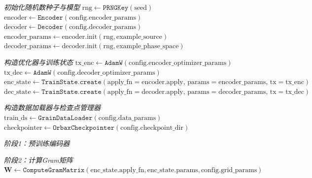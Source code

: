 \begin{algorithm}[htbp]
    \caption{EfficientRTE完整训练流程}
    \label{alg:training_efficientrte}
    \SetAlgoLined

    \BlankLine

    \emph{初始化随机数种子与模型}\;
    $\text{rng} \gets \texttt{PRNGKey}(\text{seed})$\;
    $\text{encoder} \gets \texttt{Encoder}(\text{config.encoder\_params})$\;
    $\text{decoder} \gets \texttt{Decoder}(\text{config.decoder\_params})$\;
    $\text{encoder\_params} \gets \text{encoder.init}(\text{rng}, \text{example\_source})$\;
    $\text{decoder\_params} \gets \text{decoder.init}(\text{rng}, \text{example\_phase\_space})$\;

    \emph{构造优化器与训练状态}\;
    $\text{tx\_enc} \gets \texttt{AdamW}(\text{config.encoder\_optimizer\_params})$\;
    $\text{tx\_dec} \gets \texttt{AdamW}(\text{config.decoder\_optimizer\_params})$\;
    $\text{enc\_state} \gets \texttt{TrainState.create}(\text{apply\_fn}=\text{encoder.apply},\, \text{params}=\text{encoder\_params},\, \text{tx}=\text{tx\_enc})$\;
    $\text{dec\_state} \gets \texttt{TrainState.create}(\text{apply\_fn}=\text{decoder.apply},\, \text{params}=\text{decoder\_params},\, \text{tx}=\text{tx\_dec})$\;

    \emph{构造数据加载器与检查点管理器}\;
    $\text{train\_ds} \gets \texttt{GrainDataLoader}(\text{config.data\_params})$\;
    $\text{checkpointer} \gets \texttt{OrbaxCheckpointer}(\text{config.checkpoint\_dir})$\;

    \emph{阶段1：预训练编码器}\;

    \emph{阶段2：计算Gram矩阵}\;
    $\boldsymbol{W} \gets \texttt{ComputeGramMatrix}(\text{enc\_state.apply\_fn}, \text{enc\_state.params}, \text{config.grid\_params})$\;


\end{algorithm}

